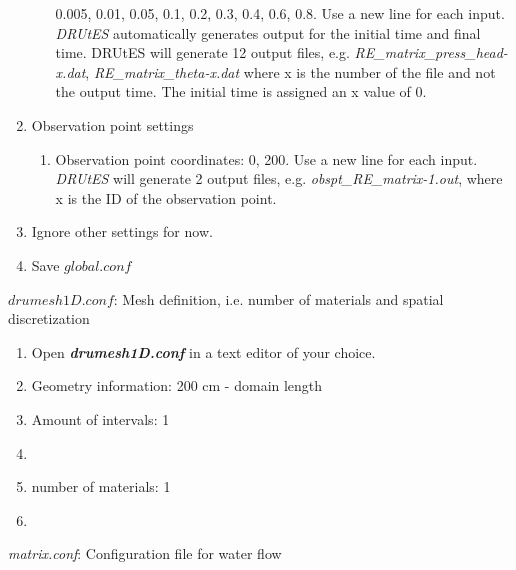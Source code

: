 \documentclass[
10pt, %
a4paper, %
oneside, %
headinclude,footinclude, %
BCOR5mm, %
]{scrartcl}
\begin{document}
\begin{enumerate}
\begin{enumerate}
0.005,
0.01,
0.05,
0.1,
0.2,
0.3,
0.4,
0.6,
0.8. Use a new line for each input. \textit{DRUtES} automatically generates output for the initial time and final time. DRUtES will generate 12 output files, e.g. \textit{RE\_matrix\_press\_head-x.dat}, \textit{RE\_matrix\_theta-x.dat} where x is the number of the file and not the output time. The initial time is assigned an x value of 0. 
\end{enumerate}
\item Observation point settings \begin{enumerate}
\item Observation point coordinates: 0, 200. Use a new line for each input. \textit{DRUtES} will generate 2 output files, e.g. \textit{obspt\_RE\_matrix-1.out}, where x is the ID of the observation point. 
\end{enumerate}
\item Ignore other settings for now. 
\item Save $global.conf$
\end{enumerate}


$drumesh1D.conf$: Mesh definition, i.e. number of materials and spatial discretization
\begin{enumerate}
\item Open \textbf{\emph{drumesh1D.conf}} in a text editor of your choice. 
\item Geometry information: 200 cm - domain length
\item Amount of intervals: 1
\item
{}
\item number of materials: 1
\item {}
\end{enumerate}

\emph{matrix.conf}: Configuration file for water flow 
\end{document}
